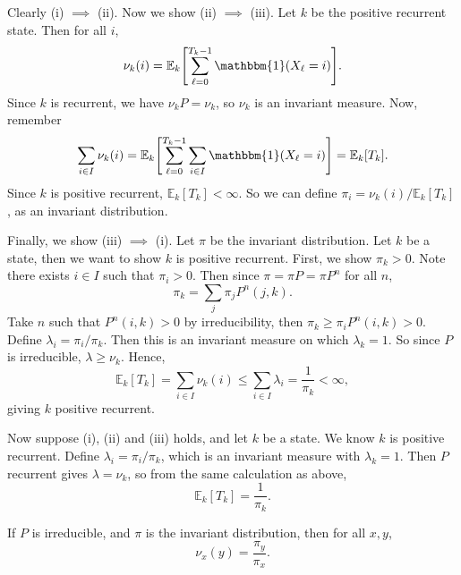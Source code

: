 \documentclass[12pt]{article}
\begin{document}
\begin{proofbox}
	Clearly (i) $\implies$ (ii). Now we show (ii) $\implies$ (iii). Let $k$ be the positive recurrent state. Then for all $i$,
	\[
		\nu_k(i) = \mathbb{E}_k\Biggl[\sum_{\ell = 0}^{T_{k} - 1}\mathbbm{1}(X_{\ell} = i) \Biggr]
	.\]
	Since $k$ is recurrent, we have $\nu_k P = \nu_k$, so $\nu_k$ is an invariant measure. Now, remember
	\[
		\sum_{i \in I}\nu_k(i) = \mathbb{E}_k\Biggl[\sum_{\ell = 0}^{T_k - 1} \sum_{i \in I}\mathbbm{1}(X_{\ell} = i) \Biggr] = \mathbb{E}_k[T_k]
	.\]
	Since $k$ is positive recurrent, $\mathbb{E}_k[T_k] < \infty$. So we can define $\pi_i = \nu_k(i)/\mathbb{E}_k[T_k]$, as an invariant distribution.

	Finally, we show (iii) $\implies$ (i). Let $\pi$ be the invariant distribution. Let $k$ be a state, then we want to show $k$ is positive recurrent. First, we show $\pi_k > 0$. Note there exists $i \in I$ such that $\pi_i > 0$. Then since $\pi = \pi P = \pi P^{n}$ for all $n$,
	\[
		\pi_k = \sum_{j} \pi_j P^{n}(j, k)
	.\]
	Take $n$ such that $P^{n}(i, k) > 0$ by irreducibility, then $\pi_k \geq \pi_i P^{n}(i, k) > 0$. Define $\lambda_i = \pi_i/\pi_k$. Then this is an invariant measure on which $\lambda_k = 1$. So since $P$ is irreducible, $\lambda \geq \nu_k$. Hence,
	\[
		\mathbb{E}_k[T_k] = \sum_{i \in I}\nu_k(i) \leq \sum_{i \in I}\lambda_i = \frac{1}{\pi_k} < \infty
	,\]
	giving $k$ positive recurrent.

	Now suppose (i), (ii) and (iii) holds, and let $k$ be a state. We know $k$ is positive recurrent. Define $\lambda_i = \pi_i/\pi_k$, which is an invariant measure with $\lambda_k = 1$. Then $P$ recurrent gives $\lambda = \nu_k$, so from the same calculation as above,
	\[
		\mathbb{E}_k[T_k] = \frac{1}{\pi_k}
	.\]
\end{proofbox}

\begin{corollary}
	If $P$ is irreducible, and $\pi$ is the invariant distribution, then for all $x, y$,
	\[
		\nu_x(y) = \frac{\pi_y}{\pi_x}
	.\]
\end{corollary}
\end{document}
